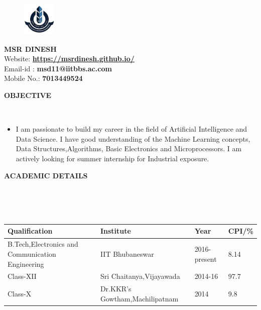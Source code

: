 \documentclass[a4paper,10pt]{article}
\newcommand{\lsep}{-0.5cm}
\newcommand{\resheading}[1]{{\small \colorbox{mygrey}{\begin{minipage}{0.975\textwidth}{\textbf{#1 \vphantom{p\^{E}}}}\end{minipage}}}}
\begin{document}
\linespread{0.25}
\hspace{0.5cm}\\[-0.25cm]
\begin{figure}
\begin{flushleft}
\includegraphics[width=0.145\textwidth, left]{logo}
\end{flushleft}
\end{figure}


\begin{centering}
\bigbreak
\bigbreak
\bigbreak
\textbf{MSR DINESH} \\
\noindent Website: \href{https://msrdinesh.github.io/}{\textbf{https://msrdinesh.github.io/}} \\
\noindent Email-id : \textbf{msd11@iitbbs.ac.com} \\
\noindent Mobile No.: \textbf{7013449524} \\
\end{centering}
\bigbreak
\bigbreak
\bigbreak
\resheading{\textbf{OBJECTIVE} }\\[\lsep]
\begin{itemize}
\item \noindent I am passionate to  build my career in the field of Artificial Intelligence and Data Science. I have   good understanding of the Machine Learning concepts, Data Structures,Algorithms,  Basic Electronics and  Microprocessors. I am actively looking for summer internship for Industrial exposure.

\end{itemize}


\resheading{\textbf{ACADEMIC DETAILS} }\\[\lsep]
\\ \\
\indent \begin{tabular}{ |l @{\hskip 0.45in}| l @{\hskip 0.45in}| l @{\hskip 0.45in} l|}
\hline
\textbf{Qualification} &  \textbf{Institute} & \textbf{Year} & \textbf{CPI/\%} \\
\hline
B.Tech,Electronics and Communication Engineering & IIT Bhubaneswar & 2016-present & 8.14 \\
Class-XII & Sri Chaitanya,Vijayawada & 2014-16 & 97.7\\
Class-X & Dr.KKR's Gowtham,Machilipatnam & 2014 & 9.8 \\

\hline
\end{tabular}
\\ \\
\end{document}
